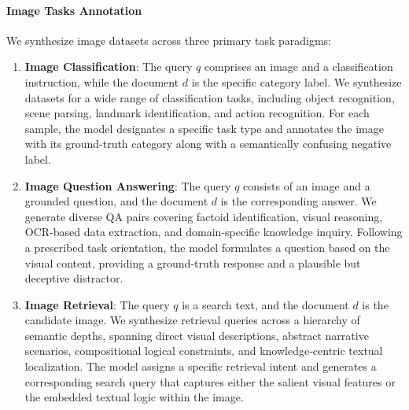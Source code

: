 \documentclass{article} %
\begin{document}
\paragraph{Image Tasks Annotation} We synthesize image datasets across three primary task paradigms:
\begin{enumerate}
    \item \textbf{Image Classification}: The query $q$ comprises an image and a classification instruction, while the document $d$ is the specific category label. We synthesize datasets for a wide range of classification tasks, including object recognition, scene parsing, landmark identification, and action recognition. For each sample, the model designates a specific task type and annotates the image with its ground-truth category along with a semantically confusing negative label. 
    \item \textbf{Image Question Answering}: The query $q$ consists of an image and a grounded question, and the document $d$ is the corresponding answer. We generate diverse QA pairs covering factoid identification, visual reasoning, OCR-based data extraction, and domain-specific knowledge inquiry. Following a prescribed task orientation, the model formulates a question based on the visual content, providing a ground-truth response and a plausible but deceptive distractor. 
    \item \textbf{Image Retrieval}: The query $q$ is a search text, and the document $d$ is the candidate image. We synthesize retrieval queries across a hierarchy of semantic depths, spanning direct visual descriptions, abstract narrative scenarios, compositional logical constraints, and knowledge-centric textual localization. The model assigns a specific retrieval intent and generates a corresponding search query that captures either the salient visual features or the embedded textual logic within the image. 
\end{enumerate}
\end{document}
